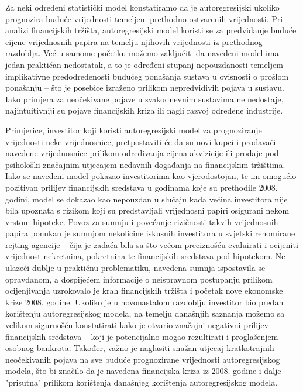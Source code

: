 \documentclass[a4paper,12pt,oneside]{memoir}
\begin{document}
            Za neki određeni statistički model konstatiramo da je autoregresijski ukoliko prognozira buduće vrijednosti temeljem prethodno ostvarenih vrijednosti. Pri analizi financijskih tržišta, autoregresijski model koristi se za predviđanje buduće cijene vrijednosnih papira na temelju njihovih vrijednosti iz prethodnog razdoblja. Već u samome početku možemo zaključiti da navedeni model ima jedan praktičan nedostatak, a to je određeni stupanj nepouzdanosti temeljem implikativne predodređenosti budućeg ponašanja sustava u ovisnosti o prošlom ponašanju -- što je posebice izraženo prilikom nepredvidivih pojava u sustavu. Iako primjera za neočekivane pojave u svakodnevnim sustavima ne nedostaje, najintuitivniji su pojave financijskih kriza ili nagli razvoj određene industrije.

            Primjerice, investitor koji koristi autoregresijski model za prognoziranje vrijednosti neke vrijednosnice, pretpostaviti će da su novi kupci i prodavači navedene vrijednosnice prilikom određivanja cijena akvizicije ili prodaje pod psihološki značajnim utjecajem nedavnih događanja na financijskim tržištima. Iako se navedeni model pokazao investitorima kao vjerodostojan, te im omogućio pozitivan prilijev financijskih sredstava u godinama koje su prethodile 2008. godini, model se dokazao kao nepouzdan u slučaju kada većina investitora nije bila upoznata s rizikom koji su predstavljali vrijednosni papiri osigurani nekom vrstom hipoteke. Povoz za sumnju i povećanje rizičnosti takvih vrijednosnih papira ponukan je sumnjom nekolicine iskusnih investitora u svjetski renomirane rejting agencije -- čija je zadaća bila sa što većom preciznošću evaluirati i ocijeniti vrijednost nekretnina, pokretnina te financijskih sredstava pod hipotekom. Ne ulazeći dublje u praktičnu problematiku, navedena sumnja ispostavila se opravdanom, a dospijećem informacije o neispravnom postupanju prilikom ocijenjivanja uzrokovalo je krah financijskih tržišta i početak nove ekonomske krize 2008. godine. Ukoliko je u novonastalom razdoblju investitor bio predan korištenju autoregresijskog modela, na temelju današnjih saznanja možemo sa velikom sigurnošću konstatirati kako je otvario značajni negativni prilijev financijskih sredstava -- koji je potencijalno mogao rezultirati i proglašenjem osobnog bankrota. Također, važno je naglasiti snažan utjecaj kratkotrajnih neočekivanih pojava na sve buduće prognozirane vrijednosti autoregresijskog modela, što bi značilo da je navedena financijska kriza iz 2008. godine i dalje "prisutna" prilikom korištenja današnjeg korištenja autoregresijskog modela.
\end{document}
